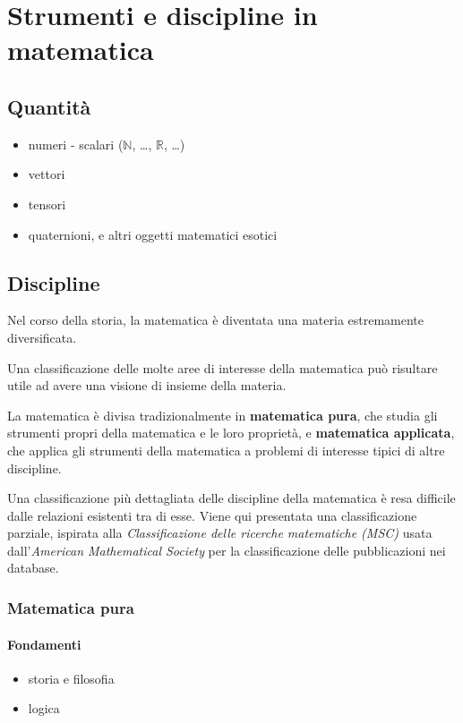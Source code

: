 
\chapter{Strumenti e discipline in matematica}

{\color{red}
\section{Quantità}
\begin{itemize}
    \item numeri - scalari ($\mathbb{N}$, \dots, $\mathbb{R}$, \dots)
    \item vettori
    \item tensori
    \item quaternioni, e altri oggetti matematici esotici
\end{itemize}
}

\section{Discipline}
Nel corso della storia, la matematica è diventata una materia estremamente diversificata. 

Una classificazione delle molte aree di interesse della matematica può risultare utile ad avere una visione di insieme della materia. 

La matematica è divisa tradizionalmente in \textbf{matematica pura}, che studia gli strumenti propri della matematica e le loro proprietà, e \textbf{matematica applicata}, che applica gli strumenti della matematica a problemi di interesse tipici di altre discipline.

Una classificazione più dettagliata delle discipline della matematica è resa difficile dalle relazioni esistenti tra di esse. Viene qui presentata una classificazione parziale, ispirata alla \textit{Classificazione delle ricerche matematiche (MSC)} usata dall'\textit{American Mathematical Society} per la classificazione delle pubblicazioni nei database.

\subsection{Matematica pura}
\subsubsection{Fondamenti}
\begin{itemize}
    \item storia e filosofia
    \item logica
\end{itemize}
